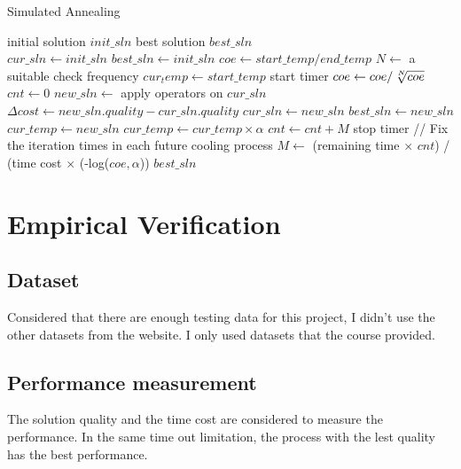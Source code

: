 \documentclass[9pt,shortpaper,twoside,web]{ieeecolor}
\begin{document}
 \begin{algorithm}
 \caption{Simulated Annealing}
 \begin{algorithmic}[h]
 \renewcommand{\algorithmicrequire}{\textbf{Input:}}
 \renewcommand{\algorithmicensure}{\textbf{Output:}}
 \REQUIRE initial solution $init\_sln$ 
 \ENSURE  best solution $best\_sln$\\ 
 \STATE $cur\_sln\gets init\_sln$
 \STATE $best\_sln\gets init\_sln$
 \STATE $coe\gets start\_temp / end\_temp$ 
 \STATE $N\gets$ a suitable check frequency
 \STATE $cur_temp\gets start\_temp$
 \STATE start timer
 \STATE $coe\gets coe/\sqrt[\leftroot{-2}\uproot{2}N]{coe}$
 \STATE $cnt\gets 0$
 \STATE $new\_sln\gets$ apply operators on $cur\_sln$ 
 \STATE $\Delta cost\gets new\_sln.quality - cur\_sln.quality$
 \STATE $cur\_sln\gets new\_sln$
 \STATE $best\_sln\gets new\_sln$
 \ENDIF
 \STATE $cur\_temp\gets new\_sln$
 \ENDIF
 \ENDFOR
 \STATE $cur\_temp\gets cur\_temp \times \alpha$
 \STATE $cnt \gets cnt + M$
 \ENDWHILE
 \STATE stop timer
 \STATE // Fix the iteration times in each future cooling process
 \STATE $M\gets$ (remaining time $\times$ $cnt$) / (time cost $\times$ (-log($coe,\alpha$))
 \ENDFOR
 \RETURN $best\_sln$
 \end{algorithmic} 
 \end{algorithm}
 
\section{Empirical Verification}

\subsection{Dataset}
Considered that there are enough testing data for this project, I didn't use the other datasets from the website. I only used datasets that the course provided.

\subsection{Performance measurement}
The solution quality and the time cost are considered to measure the performance. In the same time out limitation, the process with the lest quality has the best performance.  
\end{document}
